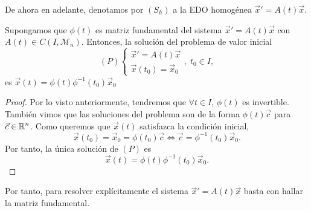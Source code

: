 \begin{notation}
De ahora en adelante, denotamos por $\displaystyle \left(S_{h}\right) $ a la EDO homogénea $\displaystyle \vec{x}'=A\left(t\right)\vec{x} $.
\end{notation}
 
\begin{colorary}
Supongamos que $\displaystyle \phi\left(t\right) $ es matriz fundamental del sistema $\displaystyle \vec{x}'=A\left(t\right)\vec{x} $ con $\displaystyle A\left(t\right) \in C\left(I, \mathcal{M}_{n}\right) $. Entonces, la solución del problema de valor inicial
\[ \left(P\right)
\begin{cases}
\vec{x}'=A\left(t\right)\vec{x} \\
\vec{x}\left(t_{0}\right)=\vec{x}_{0}
\end{cases}
, \; t_{0} \in I,\]
es $\displaystyle \vec{x}\left(t\right)=\phi\left(t\right)\phi^{-1}\left(t_{0}\right)\vec{x}_{0} $ 
\end{colorary}
\begin{proof}
Por lo visto anteriormente, tendremos que $\displaystyle \forall t \in I $, $\displaystyle \phi\left(t\right) $ es invertible. También vimos que las soluciones del problema son de la forma $\displaystyle \phi\left(t\right)\vec{c} $ para $\displaystyle \vec{c} \in \mathbb{R}^{n} $. Como queremos que $\displaystyle \vec{x}\left(t\right) $ satisfazca la condición inicial,
\[\vec{x}\left(t_{0}\right)=\vec{x}_{0}=\phi\left(t_{0}\right)\vec{c} \iff \vec{c}=\phi^{-1}\left(t_{0}\right)\vec{x}_{0} .\]
Por tanto, la única solución de $\displaystyle \left(P\right) $ es
\[\vec{x}\left(t\right)=\phi\left(t\right)\phi^{-1}\left(t_{0}\right)\vec{x}_{0} .\]
\end{proof}
\begin{observation}
Por tanto, para resolver explícitamente el sistema $\displaystyle \vec{x}' = A\left(t\right)\vec{x} $ basta con hallar la matriz fundamental. 
\end{observation}

